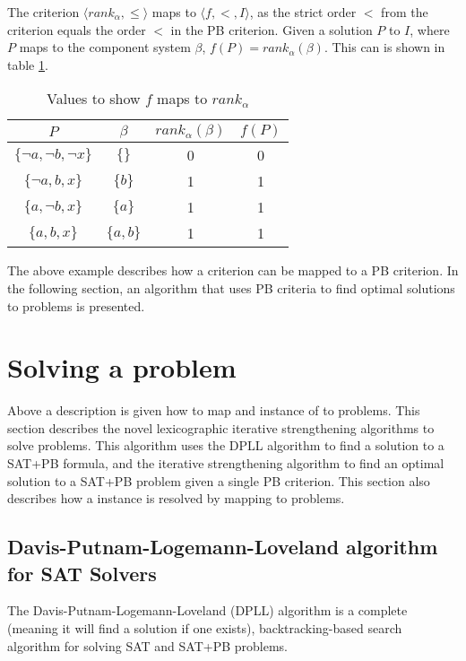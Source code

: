 The criterion $\langle rank_{\alpha}, \leq \rangle$ maps to $\langle f, < , I \rangle$,
as the strict order $<$ from the criterion equals the order $<$ in the PB criterion.
Given a solution $P$ to $I$, where $P$ maps to the component system $\beta$, $f(P) = rank_{\alpha}(\beta)$.
This can is shown in table \ref{impl.critmapexmp}.
\begin{table}[h!]
\centering
\begin{tabular}{| c | c | c | c |}
\hline
$P$                                &    $\beta$            & $rank_{\alpha}(\beta)$     & $f(P)$\\ \hline    
$\{\neg a, \neg b, \neg x\}$     & $\{\}$                & 0                        & 0 \\
$\{\neg a,  b, x\}$             & $\{b\}$                & 1                        & 1 \\
$\{ a,  \neg b, x\}$             & $\{a\}$                & 1                        & 1 \\
$\{ a,  b, x\}$                 & $\{a,b\}$                & 1                        & 1 \\ \hline
\end{tabular}
\caption{Values to show $f$  maps to $rank_{\alpha}$}
\label{impl.critmapexmp}
\end{table}

The above example describes how a \modelname criterion can be mapped to a PB criterion.
In the following section, an algorithm that uses PB criteria to find optimal solutions to \modelimpl problems is presented. 

\section{Solving a \modelimpl problem}
\label{impl.algorithms}
Above a description is given how to map and instance of \modelname to \modelimpl problems.
This section describes the novel lexicographic iterative strengthening algorithms to solve \modelimpl problems.
This algorithm uses the DPLL algorithm \citep{Davis1960, davis1962machine} to find a solution to a SAT+PB formula,
and the iterative strengthening algorithm \citep{calistri1994iterative, le2010sat4j} to find an optimal solution to a SAT+PB problem given a  single PB criterion.
This section also describes how a \modelname instance is resolved by mapping to \modelimpl problems.

\subsection{Davis-Putnam-Logemann-Loveland algorithm for SAT Solvers}
The Davis-Putnam-Logemann-Loveland (DPLL) algorithm \citep{Davis1960, davis1962machine} is a complete (meaning it will find a solution if one exists), 
backtracking-based search algorithm for solving SAT and SAT+PB problems.

